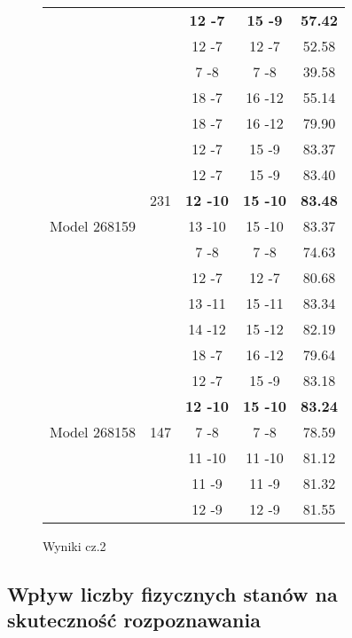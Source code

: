 \documentclass[11pt]{article}
\begin{document}
\begin{figure}
\begin{tabular}{|c|c|c|c|c|}
					&& \textbf{12 -7} & \textbf{15 -9} & \textbf{57.42} \\
					&& 12 -7 & 12 -7 & 52.58 \\
					&& 7 -8  & 7 -8  & 39.58 \\
					&& 18 -7 & 16 -12& 55.14 \\
					\hline
					\multirow{9}{*}{Model 268159} &
					\multirow{7}{*}{231}            &
					18 -7 & 16 -12 & 79.90 \\
					&& 12 -7 & 15 -9  & 83.37 \\
					&& 12 -7 & 15 -9  & 83.40 \\
					&& \textbf{12 -10}& \textbf{15 -10} & \textbf{83.48} \\
					&& 13 -10& 15 -10 & 83.37 \\
					&& 7 -8  & 7 -8   & 74.63 \\
					&& 12 -7 & 12 -7  & 80.68 \\
					&& 13 -11& 15 -11 & 83.34 \\
					&& 14 -12& 15 -12 & 82.19 \\
					\hline
					\multirow{7}{*}{Model 268158} &
					\multirow{7}{*}{147}            &
					18 -7 & 16 -12 & 79.64 \\
					&& 12 -7 & 15 -9  & 83.18 \\
					&& \textbf{12 -10}& \textbf{15 -10} & \textbf{83.24} \\
					&& 7 -8  & 7 -8   & 78.59 \\
					&& 11 -10& 11 -10 &  81.12 \\
					&& 11 -9 & 11 -9  &  81.32 \\
					&& 12 -9 & 12 -9  &  81.55 \\
					\hline					
					
				\end{tabular}
			\caption{\label{tab:metadata_impact}Wyniki cz.2}
		\end{figure}
		
	\subsection{Wpływ liczby fizycznych stanów na skuteczność rozpoznawania }
		\label{sec:q-num_impact}
	
\end{document}
